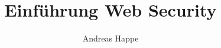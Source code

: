\documentclass{book}
\begin{document}
\title{Einführung Web Security}
\author{Andreas Happe}


\tableofcontents %


\end{document}
